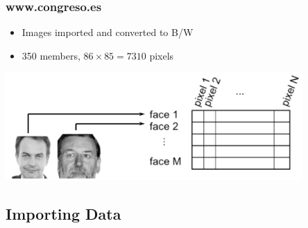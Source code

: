 \documentclass[10pt, colorlinks]{beamer}
\begin{document}
\begin{frame}

\end{frame}




\begin{frame}
  \frametitle{www.congreso.es}
  \begin{itemize}
  \item Images imported and converted to B/W
  \item 350 members, $86 \times 85 =7310$ pixels
  \end{itemize}
  \includegraphics[width=0.85\textwidth]{figs/features}  
\end{frame}

\subsection{Importing Data}
\end{document}
